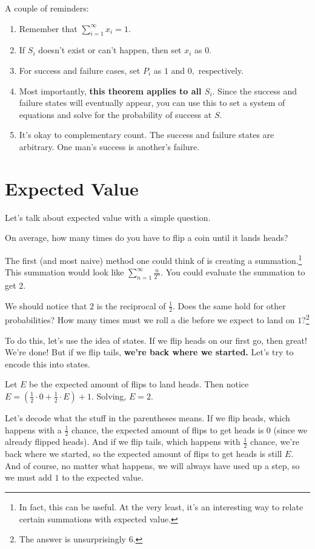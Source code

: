 \documentclass[blue,onecol]{shooting}
\begin{document}
A couple of reminders:

\begin{enumerate}
    \item Remember that $\sum\limits_{i=1}^{\infty}x_i=1.$
    
    \item If $S_i$ doesn't exist or can't happen, then set $x_i$ as $0.$
    
    \item For success and failure cases, set $P_i$ as $1$ and $0,$ respectively.
    
    \item Most importantly, \textbf{this theorem applies to all $S_i.$} Since the success and failure states will eventually appear, you can use this to set a system of equations and solve for the probability of success at $S.$
    
    \item It's okay to complementary count. The success and failure states are arbitrary. One man's success is another's failure.
\end{enumerate}
\section{Expected Value}

Let's talk about expected value with a simple question.

\begin{exam}
On average, how many times do you have to flip a coin until it lands heads?
\end{exam}

The first (and most naive) method one could think of is creating a summation.\footnote{In fact, this can be useful. At the very least, it's an interesting way to relate certain summations with expected value.} This summation would look like $\sum_{n=1}^{\infty}\frac{n}{2^n}.$ You could evaluate the summation to get $2.$

We should notice that $2$ is the reciprocal of $\frac{1}{2}.$ Does the same hold for other probabilities? How many times must we roll a die before we expect to land on $1?$\footnote{The answer is unsurprisingly $6.$}

To do this, let's use the idea of states. If we flip heads on our first go, then great! We're done! But if we flip tails, \textbf{we're back where we started.} Let's try to encode this into states.

\begin{sol}
Let $E$ be the expected amount of flips to land heads. Then notice $E=(\frac{1}{2}\cdot 0+\frac{1}{2}\cdot E)+1.$ Solving, $E=2.$
\end{sol}
Let's decode what the stuff in the parentheses means. If we flip heads, which happens with a $\frac{1}{2}$ chance, the expected amount of flips to get heads is $0$ (since we already flipped heads). And if we flip tails, which happens with $\frac{1}{2}$ chance, we're back where we started, so the expected amount of flips to get heads is still $E.$ And of course, no matter what happens, we will always have used up a step, so we must add $1$ to the expected value.
\end{document}
